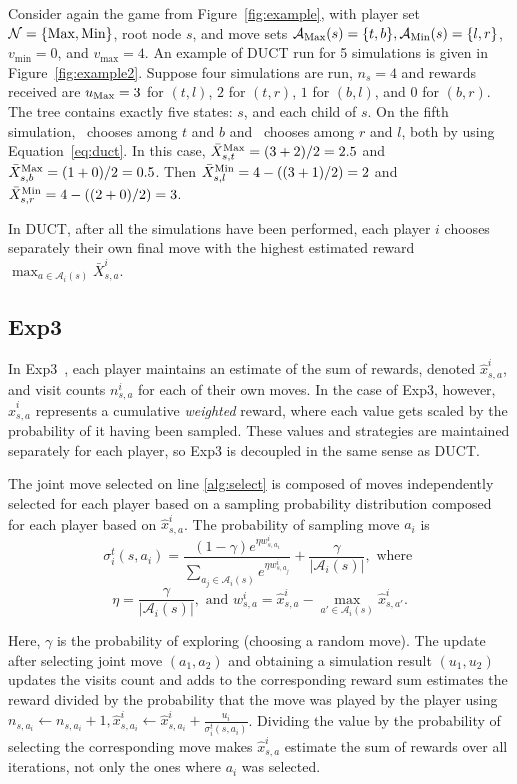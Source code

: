 \documentclass[conference]{IEEEtran}
\newcommand{\cA}{\mathcal{A}}
\newcommand{\cN}{\mathcal{N}}
\begin{document}
Consider again the game from Figure~\ref{fig:example}, with player set $\cN = \{\Max,\Min\}$, root node $s$,
and move sets $\cA_{\Max}(s) = \{t,b\}, \cA_{\Min}(s) = \{l,r\}$, $v_{\min} = 0$, and $v_{\max} = 4$. 
An example of DUCT run for 5 simulations is 
given in Figure~\ref{fig:example2}.
Suppose four simulations are run, $n_s = 4$ and rewards received are $u_{\text{Max}} = 3$ for $(t,l)$, $2$ for $(t,r)$, $1$ for $(b,l)$, 
and $0$ for $(b,r)$. The tree contains exactly five states: $s$, and each child of $s$. On the fifth simulation, 
\Max~chooses among $t$ and $b$ and \Min~chooses among $r$ and $l$, both by using Equation~\ref{eq:duct}. 
In this case, $\bar{X}_{s,t}^{\text{Max}} = (3 + 2) / 2 = 2.5$ and $\bar{X}_{s,b}^{\text{Max}} = (1 + 0) / 2 = 0.5$. 
Then $\bar{X}_{s,l}^{\text{Min}} = 4 - ((3 + 1) / 2) = 2$ and $\bar{X}^{\text{Min}}_{s,r} = 4 - ((2 + 0) / 2) = 3$. 

In DUCT, after all the simulations have been performed, each player $i$ chooses separately their own final move 
with the highest estimated reward $\max_{a \in \cA_i(s)} \bar{X}^i_{s,a}$. 

\subsection{Exp3}

In Exp3~\cite{Exp3}, each player maintains an estimate of the sum of rewards, denoted $\hat{x}^i_{s,a}$, and visit 
counts $n^i_{s,a}$ for each of their own moves. In the case of Exp3, however, $\hat{x}^i_{s,a}$ represents a cumulative 
{\it weighted} reward, where each value gets scaled by the probability of it having been sampled. 
These values and strategies are maintained separately for each player, so Exp3 is decoupled in the same sense as DUCT. 

The joint move selected on line \ref{alg:select} is composed of moves independently selected for each player 
based on a sampling probability distribution composed for each player based on $\hat{x}^i_{s,a}$. 
The probability of sampling move $a_i$ is
\begin{equation}
\label{eq:exp3select}
\sigma^t_i(s,a_i) = \frac{(1-\gamma) e^{\eta w^i_{s,a_i}}}{\sum_{a_j \in \cA_i(s)} e^{\eta w^i_{s,a_j}}} + \frac{\gamma}{|\cA_i(s)|}, \mbox{ where }
\end{equation}
\[ \eta = \frac{\gamma}{|\cA_i(s)|}, \mbox{ and } w^i_{s,a} = \hat{x}^i_{s,a} - \max_{a' \in \cA_i(s)} \hat{x}^i_{s,a'}. \]

\noindent Here, $\gamma$ is the probability of exploring (choosing a random move). 
The update after selecting joint move $(a_1,a_2)$ and obtaining a simulation result $(u_1,u_2)$ updates the visits count 
and adds to the corresponding reward sum estimates the reward divided by the probability that the move was played by the player using
$n_{s,a_i} \leftarrow n_{s,a_i} + 1, \hat{x}^i_{s,a_i} \leftarrow \hat{x}^i_{s,a_i} + \frac{u_i}{\sigma^t_i(s,a_i)}$.
Dividing the value by the probability of selecting the corresponding move makes $\hat{x}^i_{s,a}$ estimate the sum of rewards over all 
iterations, not only the ones where $a_i$ was selected. 
\end{document}
